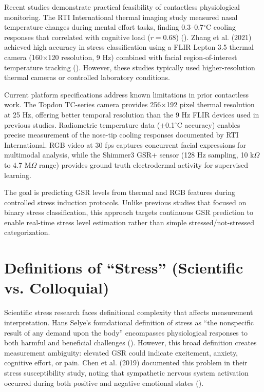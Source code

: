 Recent studies demonstrate practical feasibility of contactless physiological monitoring. The RTI International thermal imaging study measured nasal temperature changes during mental effort tasks, finding 0.3--0.7$^\circ$C cooling responses that correlated with cognitive load ($r = 0.68$) (\citep{ref6}). Zhang et al. (2021) achieved high accuracy in stress classification using a FLIR Lepton 3.5 thermal camera (160$\times$120 resolution, 9 Hz) combined with facial region-of-interest temperature tracking (\citep{ref5}). However, these studies typically used higher-resolution thermal cameras or controlled laboratory conditions.

Current platform specifications address known limitations in prior contactless work. The Topdon TC-series camera provides 256$\times$192 pixel thermal resolution at 25 Hz, offering better temporal resolution than the 9 Hz FLIR devices used in previous studies. Radiometric temperature data ($\pm$0.1$^\circ$C accuracy) enables precise measurement of the nose-tip cooling responses documented by RTI International. RGB video at 30 fps captures concurrent facial expressions for multimodal analysis, while the Shimmer3 GSR+ sensor (128 Hz sampling, 10 k$\Omega$ to 4.7 M$\Omega$ range) provides ground truth electrodermal activity for supervised learning.

The goal is predicting GSR levels from thermal and RGB features during controlled stress induction protocols. Unlike previous studies that focused on binary stress classification, this approach targets continuous GSR prediction to enable real-time stress level estimation rather than simple stressed/not-stressed categorization.

\section{Definitions of ``Stress'' (Scientific vs. Colloquial)}
Scientific stress research faces definitional complexity that affects measurement interpretation. Hans Selye's foundational definition of stress as ``the nonspecific result of any demand upon the body'' encompasses physiological responses to both harmful and beneficial challenges (\citep{ref11}). However, this broad definition creates measurement ambiguity: elevated GSR could indicate excitement, anxiety, cognitive effort, or pain. Chen et al. (2019) documented this problem in their stress susceptibility study, noting that sympathetic nervous system activation occurred during both positive and negative emotional states (\citep{ref4}).

